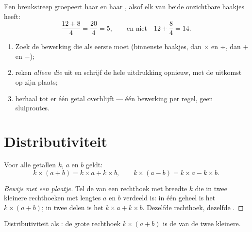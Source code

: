 \begin{remark}
Een breukstreep groepeert haar  en haar , alsof elk van beide
onzichtbare haakjes heeft:
\[
\frac{12 + 8}{4} = \frac{20}{4} = 5,
\qquad\text{en niet}\quad 12 + \frac{8}{4} = 14 .
\]
\end{remark}

\begin{method}\label{met:g7:priorities:safe}
\begin{enumerate}
  \item Zoek de bewerking die als eerste moet (binnenste haakjes, dan $\times$
        en $\div$, dan $+$ en $-$);
  \item reken \emph{alleen die} uit en schrijf de hele uitdrukking opnieuw, met
        de uitkomst op zijn plaats;
  \item herhaal tot er één getal overblijft --- één bewerking per regel, geen
        sluiproutes.
\end{enumerate}
\end{method}

\section{Distributiviteit}

\begin{theorem}[Distributiviteit]\label{thm:g7:priorities:distributivity}
Voor alle getallen $k$, $a$ en $b$ geldt:
\[
k \times (a + b) = k \times a + k \times b,
\qquad
k \times (a - b) = k \times a - k \times b .
\]
\end{theorem}

\begin{proof}[Bewijs met een plaatje]
Tel de  van een rechthoek met breedte $k$ die in twee kleinere
rechthoeken met lengtes $a$ en $b$ verdeeld is: in één geheel is het
$k \times (a+b)$; in twee delen is het $k \times a + k \times b$. Dezelfde
rechthoek, dezelfde .
\end{proof}

\begin{omfigure}

{\small Distributiviteit als : de grote rechthoek
$k \times (a + b)$ is de  van de twee kleinere.}
\end{omfigure}

